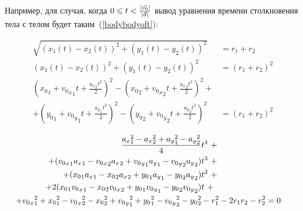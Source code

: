 Например, для случая, когда \(0 \leqslant t < \frac{\left|\vec{v_0}\right|}{\left|\vec{a}\right|}\) вывод уравнения времени столкновения тела с телом будет таким~(\ref{bodybodyoft}):

\begin{align}
  \sqrt{(x_1(t) - x_2(t))^2 + (y_1(t) - y_2(t))^2}        & = r_1 + r_2 \nonumber     \\
  (x_1(t) - x_2(t))^2 + (y_1(t) - y_2(t))^2               & = (r_1 + r_2)^2 \nonumber \\
  ({x_0}_1 + {{v_0}_x}_1 t + \frac{{a_x}_1 t^2}{2})^2
  - ({x_0}_2 + {{v_0}_x}_2 t + \frac{{a_x}_2 t^2}{2})^2 + & \nonumber                 \\
  + ({y_0}_1 + {{v_0}_y}_1 t + \frac{{a_y}_1 t^2}{2})^2
  - ({y_0}_2 + {{v_0}_y}_2 t + \frac{{a_y}_2 t^2}{2})^2   & = (r_1 + r_2)^2 \nonumber
\end{align}

\begin{align}\label{bodybodyoft}
  \frac{{a_x}_1^2 - {a_x}_2^2 + {a_y}_1^2 - {a_y}_2^2  }{4}                                                                    & t^4~+  \nonumber                        \\
  + ({{v_0}_x}_1 {a_x}_1 - {{v_0}_x}_2 {a_x}_2 + {{v_0}_y}_1 {a_y}_1 - {{v_0}_y}_2 {a_y}_2)                                    & t^3~+  \nonumber                        \\
  + ({x_0}_1 {a_x}_1 - {x_0}_2 {a_x}_2 + {y_0}_1 {a_y}_1 - {y_0}_2 {a_y}_2)                                                    & t^2~+  \nonumber                        \\
  + 2 ({x_0}_1 {{v_0}_x}_1 - {x_0}_2 {{v_0}_x}_2 + {y_0}_1 {{v_0}_y}_1 - {y_0}_2 {{v_0}_y}_2)                                  & t~+                                     \\
  \hspace{-1em}+ {{v_0}_x}_1^2 + {x_0}_1^2 - {{v_0}_x}_2^2 - {x_0}_2^2 + {{v_0}_y}_1^2 + {y_0}_1^2 - {{v_0}_y}_2^2 - {y_0}_2^2 & - r_1^2 - 2r_1 r_2 - r_2^2 = 0\nonumber
\end{align}

